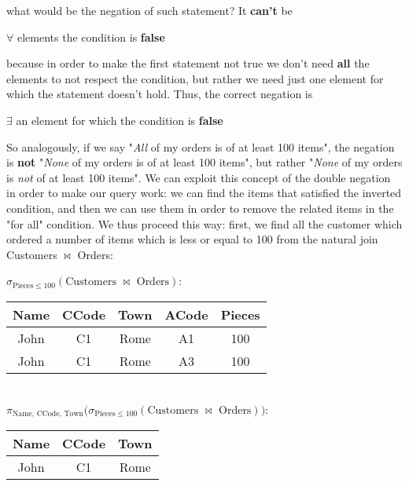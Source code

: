 what would be the negation of such statement? It \textbf{can't} be
\begin{center}
    $\forall$ elements the condition is \textbf{false}
\end{center}

because in order to make the first statement not true we don't need \textbf{all} the elements to not respect the condition, but rather we need just one element for which the statement doesn't hold. Thus, the correct negation is
\begin{center}
    $\exists$ an element for which the condition is \textbf{false}
\end{center}

So analogously, if we say "\textit{All} of my orders is of at least 100 items", the negation is \textbf{not} "\textit{None} of my orders is of at least 100 items", but rather "\textit{None} of my orders is \textit{not} of at least 100 items". We can exploit this concept of the double negation in order to make our query work: we can find the items that satisfied the inverted condition, and then we can use them in order to remove the related items in the "for all" condition. We thus proceed this way: first, we find all the customer which ordered a number of items which is less or equal to 100 from the natural join Customers $\bowtie$ Orders:
\begin{center}
    $\sigma_{\text{Pieces} \leq 100}(\text{Customers } \bowtie \text{ Orders})$: \quad \begin{tabular}{|c|c|c|c|c|}
        \hline \rowcolor{maindoccol!60}
        \textbf{Name} & \textbf{CCode} & \textbf{Town} & \textbf{ACode} & \textbf{Pieces} \\
        \hline
        John & C1 & Rome & A1 & 100 \\
        \hline
        John & C1 & Rome & A3 & 100 \\
        \hline
    \end{tabular}
    \\
    \vspace{12pt}
    $\pi_{\text{Name, CCode, Town}}\Big(\sigma_{\text{Pieces} \leq 100}(\text{Customers } \bowtie \text{ Orders})\Big)$: \quad \begin{tabular}{|c|c|c|}
        \hline \rowcolor{maindoccol!60}
        \textbf{Name} & \textbf{CCode} & \textbf{Town} \\
        \hline
        John & C1 & Rome \\
        \hline
    \end{tabular}
\end{center}

